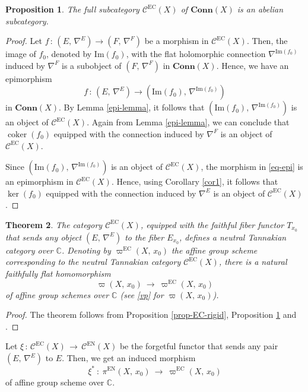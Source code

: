 \documentclass[12pt]{amsart}
\newtheorem{theorem}{Theorem}[section]
\newtheorem{proposition}[theorem]{Proposition}
\theoremstyle{definition}
\numberwithin{equation}{section}
\newcommand{\C}{\mathbb{C}}
\newcommand{\EC}{\mathcal{C}^\mathrm{EC}}
\newcommand{\coker}{\operatorname{coker}}
\begin{document}
\begin{proposition}\label{prop-EC-abelian}
The full subcategory $\EC(X)$ of $\mathbf{Conn}(X)$ is an abelian subcategory.
\end{proposition}
\begin{proof}
Let $f\,:\, (E,\, \nabla^E) \longrightarrow (F,\, \nabla^F)$ be a morphism in $\EC(X)$. 
Then, the image of $f_0$, denoted by $\mathrm{Im}(f_0)$, with the flat holomorphic connection 
$\nabla^{\mathrm{Im}(f_0)}$ induced by $\nabla^F$ is a subobject of $(F,\, \nabla^F)$ in 
$\mathbf{Conn}(X)$. Hence, we have an epimorphism 
\begin{equation}\label{eq-epi}
f\,:\, (E,\, \nabla^E) \longrightarrow (\mathrm{Im}(f_0),\, \nabla^{\mathrm{Im}(f_0)})
\end{equation}
in $\mathbf{Conn}(X)$. By Lemma \ref{epi-lemma}, it follows that 
$(\mathrm{Im}(f_0),\, \nabla^{\mathrm{Im}(f_0)})$ is an object of $\EC(X)$. Again from 
Lemma \ref{epi-lemma}, we can conclude that $\coker(f_0)$ equipped with the connection 
induced by $\nabla^F$ is an object of $\EC(X)$. 

Since $(\mathrm{Im}(f_0),\, \nabla^{\mathrm{Im}(f_0)})$ is an object of $\EC(X)$, 
the morphism in \eqref{eq-epi} is an epimorphism in $\EC(X)$. Hence, using Corollary 
\ref{cor1}, it follows that $\ker(f_0)$ equipped with the connection induced by $\nabla^E$ 
is an object of $\EC(X)$.
\end{proof}

\begin{theorem}\label{thm-fgsk}
The category $\EC(X)$, equipped with the faithful fiber functor $T_{x_0}$ that sends any object 
$(E,\, \nabla^E)$ to the fiber $E_{x_0}$, defines a neutral Tannakian category
over $\C$. Denoting by $\varpi^{\mathrm{EC}}(X,\, x_0)$ the affine group scheme corresponding 
to the neutral Tannakian category $\EC(X)$, there is a natural faithfully flat homomorphism
$$
\varpi(X,\, x_0)\ \longrightarrow\ \varpi^{\mathrm{EC}}(X,\, x_0)
$$
of affine group schemes over $\C$ (see \eqref{vp} for $\varpi(X,\, x_0)$).
\end{theorem}

\begin{proof}
The theorem follows from Proposition \ref{prop-EC-rigid}, Proposition \ref{prop-EC-abelian}
and \cite[Proposition 2.21]{DM}.
\end{proof}

Let $\xi \,:\, \EC(X) \,\longrightarrow\, \mathcal{C}^{\mathrm{EN}}(X)$ be the forgetful functor
that sends any pair $(E,\, \nabla^E)$ to $E$. Then, we get an induced morphism 
\begin{equation}\label{eq:3}
\xi^* \ :\ \pi^{\mathrm{EN}}(X,\,x_0) \ \longrightarrow\ \varpi^{\mathrm{EC}}(X,\, x_0)
\end{equation}
of affine group scheme over $\C$.
\end{document}
